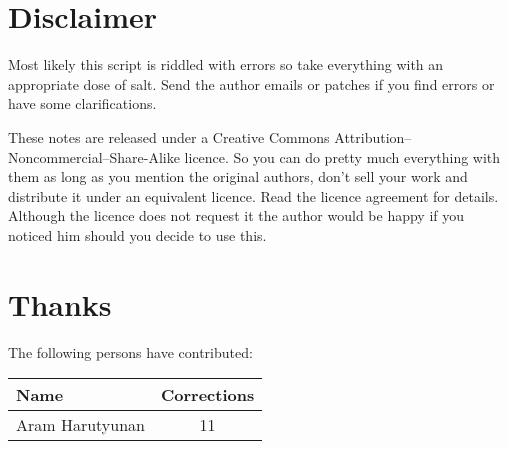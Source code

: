 \section*{Disclaimer}

Most likely this script is riddled with errors so take everything with an appropriate dose of salt. Send the author emails or patches if you find errors or have some clarifications. 

These notes are released under a Creative Commons Attribution--Noncommercial--Share-Alike licence. So you can do pretty much everything with them as long as you mention the original authors, don't sell your work and distribute it under an equivalent licence. Read the licence agreement for details. Although the licence does not request it the author would be happy if you noticed him should you decide to use this.

\section*{Thanks}
The following persons have contributed:

\begin{center}
\begin{tabular}{l|c}
Name & Corrections\\\hline
Aram Harutyunan & 11
\end{tabular}
\end{center}
\newpage